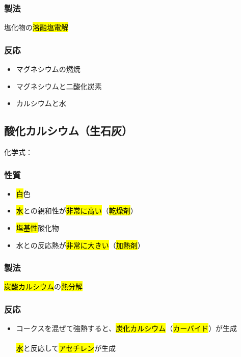 \subsubsection{製法}
塩化物の\hl{溶融塩電解} \K
\subsubsection{反応}
\begin{itemize}
    \item マグネシウムの燃焼\\
    \item マグネシウムと二酸化炭素\\
    \item カルシウムと水\\
\end{itemize}

\subsection{酸化カルシウム（生石灰）}
化学式：\hl{}
\subsubsection{性質}
\begin{itemize}
    \item \hl{白}色
    \item \hl{水}との親和性が\hl{非常に高い}（\hl{乾燥剤}）
    \item \hl{塩基性}酸化物
    \item 水との反応熱が\hl{非常に大きい}（\hl{加熱剤}）
\end{itemize}
\subsubsection{製法}
\hl{炭酸カルシウム}の\hl{熱分解}\\
\subsubsection{反応}
\begin{itemize}
    \item コークスを混ぜて強熱すると、\hl{炭化カルシウム}（\hl{カーバイド}）が生成\\
          \\
          \hl{水}と反応して\hl{アセチレン}が生成\\
\end{itemize}
